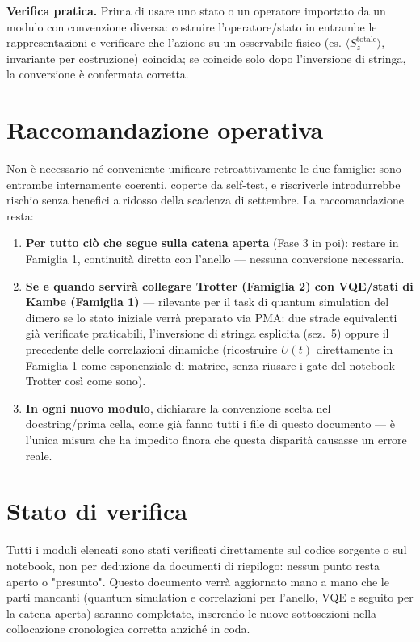 \documentclass[11pt,a4paper]{article}
\begin{document}
\textbf{Verifica pratica.} Prima di usare uno stato o un operatore
importato da un modulo con convenzione diversa: costruire
l'operatore/stato in entrambe le rappresentazioni e verificare che
l'azione su un osservabile fisico (es. $\langle S_z^{\text{totale}}\rangle$,
invariante per costruzione) coincida; se coincide solo dopo l'inversione
di stringa, la conversione è confermata corretta.

\section{Raccomandazione operativa}

Non è necessario né conveniente unificare retroattivamente le due
famiglie: sono entrambe internamente coerenti, coperte da self-test, e
riscriverle introdurrebbe rischio senza benefici a ridosso della scadenza
di settembre. La raccomandazione resta:

\begin{enumerate}
\item \textbf{Per tutto ciò che segue sulla catena aperta} (Fase 3 in
poi): restare in Famiglia 1, continuità diretta con l'anello — nessuna
conversione necessaria.
\item \textbf{Se e quando servirà collegare Trotter (Famiglia 2) con
VQE/stati di Kambe (Famiglia 1)} — rilevante per il task di quantum
simulation del dimero se lo stato iniziale verrà preparato via PMA: due
strade equivalenti già verificate praticabili, l'inversione di stringa
esplicita (sez.~5) oppure il precedente delle correlazioni dinamiche
(ricostruire $U(t)$ direttamente in Famiglia 1 come esponenziale di
matrice, senza riusare i gate del notebook Trotter così come sono).
\item \textbf{In ogni nuovo modulo}, dichiarare la convenzione scelta nel
docstring/prima cella, come già fanno tutti i file di questo documento —
è l'unica misura che ha impedito finora che questa disparità causasse un
errore reale.
\end{enumerate}

\section{Stato di verifica}

Tutti i moduli elencati sono stati verificati direttamente sul codice
sorgente o sul notebook, non per deduzione da documenti di riepilogo:
nessun punto resta aperto o "presunto". Questo documento verrà aggiornato
mano a mano che le parti mancanti (quantum simulation e correlazioni per
l'anello, VQE e seguito per la catena aperta) saranno completate,
inserendo le nuove sottosezioni nella collocazione cronologica corretta
anziché in coda.
\end{document}
